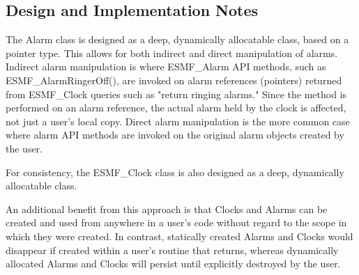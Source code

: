 
\subsection{Design and Implementation Notes}

The Alarm class is designed as a deep, dynamically allocatable class,
based on a pointer type.  This allows for both indirect and direct
manipulation of alarms.  Indirect alarm manipulation is where ESMF\_Alarm API
methods, such as ESMF\_AlarmRingerOff(), are invoked on alarm references
(pointers) returned from ESMF\_Clock queries such as "return ringing alarms."
Since the method is performed on an alarm reference, the actual alarm held
by the clock is affected, not just a user's local copy.  Direct alarm
manipulation is the more common case where alarm API methods are invoked on
the original alarm objects created by the user.

For consistency, the ESMF\_Clock class is also designed as a deep, dynamically
allocatable class. 

An additional benefit from this approach is that Clocks and Alarms can be
created and used from anywhere in a user's code without regard to the scope
in which they were created.  In contrast, statically created Alarms and
Clocks would disappear if created within a user's routine that returns,
whereas dynamically allocated Alarms and Clocks will persist until explicitly
destroyed by the user.
